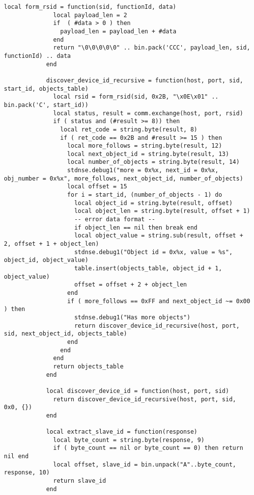 \documentclass[article,msc=informatik,type=msc,colorback,accentcolor=tud9c]{tudthesis}
\begin{document}
\begin{appendix}
\begin{lstlisting}[caption= Nmap Modbus Discovery Script, label=lst:Nmap Modbus Discovery Script]
  	      	local form_rsid = function(sid, functionId, data)
  	      	  local payload_len = 2
  	      	  if  ( #data > 0 ) then
  	      	    payload_len = payload_len + #data
  	      	  end
  	      	  return "\0\0\0\0\0" .. bin.pack('CCC', payload_len, sid, functionId) .. data
  	      	end
  	      	
  	      	discover_device_id_recursive = function(host, port, sid, start_id, objects_table)
  	      	  local rsid = form_rsid(sid, 0x2B, "\x0E\x01" .. bin.pack('C', start_id))
  	      	  local status, result = comm.exchange(host, port, rsid)
  	      	  if ( status and (#result >= 8)) then
  	      	    local ret_code = string.byte(result, 8)
  	      	    if ( ret_code == 0x2B and #result >= 15 ) then
  	      	      local more_follows = string.byte(result, 12)
  	      	      local next_object_id = string.byte(result, 13)
  	      	      local number_of_objects = string.byte(result, 14)
  	      	      stdnse.debug1("more = 0x%x, next_id = 0x%x, obj_number = 0x%x", more_follows, next_object_id, number_of_objects)
  	      	      local offset = 15
  	      	      for i = start_id, (number_of_objects - 1) do
  	      	        local object_id = string.byte(result, offset)
  	      	        local object_len = string.byte(result, offset + 1)
  	      	        -- error data format --
  	      	        if object_len == nil then break end
  	      	        local object_value = string.sub(result, offset + 2, offset + 1 + object_len)
  	      	        stdnse.debug1("Object id = 0x%x, value = %s", object_id, object_value)
  	      	        table.insert(objects_table, object_id + 1, object_value)
  	      	        offset = offset + 2 + object_len
  	      	      end
  	      	      if ( more_follows == 0xFF and next_object_id ~= 0x00 ) then
  	      	        stdnse.debug1("Has more objects")
  	      	        return discover_device_id_recursive(host, port, sid, next_object_id, objects_table)
  	      	      end
  	      	    end
  	      	  end
  	      	  return objects_table
  	      	end
  	      	
  	      	local discover_device_id = function(host, port, sid)
  	      	  return discover_device_id_recursive(host, port, sid, 0x0, {})
  	      	end
  	      	
  	      	local extract_slave_id = function(response)
  	      	  local byte_count = string.byte(response, 9)
  	      	  if ( byte_count == nil or byte_count == 0) then return nil end
  	      	  local offset, slave_id = bin.unpack("A"..byte_count, response, 10)
  	      	  return slave_id
  	      	end
  	      	

\end{lstlisting}
\end{appendix}
\end{document}

